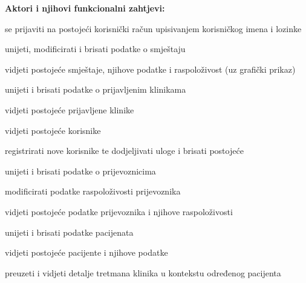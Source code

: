 			\noindent \textbf{Aktori i njihovi funkcionalni zahtjevi:}
			\begin{packed_enum}
				\item  {}
				\begin{packed_enum}
					\item se prijaviti na postojeći korisnički račun upisivanjem korisničkog imena i lozinke
				\end{packed_enum}
			
				\item  {}
				\begin{packed_enum}
					\item unijeti, modificirati i brisati podatke o smještaju
					\item vidjeti postojeće smještaje, njihove podatke i raspoloživost (uz grafički prikaz)
					\item unijeti i brisati podatke o prijavljenim klinikama
					\item vidjeti postojeće prijavljene klinike
					\item vidjeti postojeće korisnike
					\item registrirati nove korisnike te dodjeljivati uloge i brisati postojeće
				\end{packed_enum}
				
				\item  {}
				\begin{packed_enum}
					\item unijeti i brisati podatke o prijevoznicima
					\item modificirati podatke raspoloživosti prijevoznika
					\item vidjeti postojeće podatke prijevoznika i njihove raspoloživosti
				\end{packed_enum}
				
				\item  {}
				\begin{packed_enum}
					\item unijeti i brisati podatke pacijenata
					\item vidjeti postojeće pacijente i njihove podatke
					\item preuzeti i vidjeti detalje tretmana klinika u kontekstu određenog pacijenta
				\end{packed_enum}
				

\end{packed_enum}
